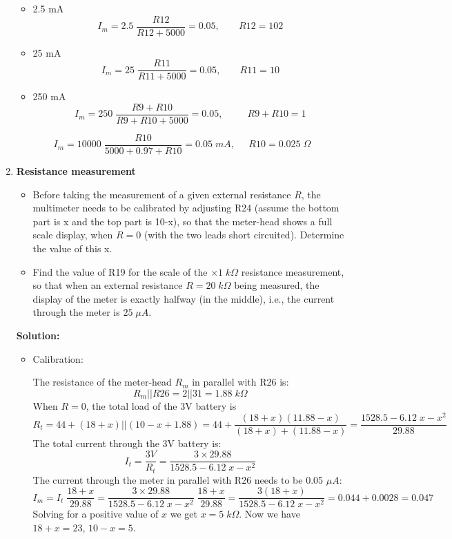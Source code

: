\begin{enumerate}
  \begin{itemize}
  \item 2.5 mA
    \[
    I_m=2.5\;\frac{R12}{R12+5000}=0.05,\;\;\;\;\;\;\;R12=102
    \]
  \item 25 mA
    \[
    I_m=25\;\frac{R11}{R11+5000}=0.05,\;\;\;\;\;\;\;R11=10
    \]
  \item 250 mA
    \[
    I_m=250\;\frac{R9+R10}{R9+R10+5000}=0.05,\;\;\;\;\;\;\;\;\;R9+R10=1
    \]
  \end{itemize}
  \[
  I_m=10000\;\frac{R10}{5000+0.97+R10}=0.05\;mA,\;\;\;\;\;
  R10=0.025\;\Omega
  \]


\item {\bf Resistance measurement}

  \begin{itemize}
  \item Before taking the measurement of a given external resistance $R$, 
    the multimeter needs to be calibrated by adjusting R24 (assume the bottom 
    part is x and the top part is 10-x), so that the meter-head shows a full 
    scale display, when $R=0$ (with the two leads short circuited). Determine 
    the value of this x. 

  \item Find the value of R19 for the scale of the $\times 1\;k\Omega$
    resistance measurement, so that when an external resistance $R=20\;k\Omega$
    being measured, the display of the meter is exactly halfway (in the middle),
    i.e., the current through the meter is $25\;\mu A$.

  \end{itemize}


  {\bf Solution:}
  
  \begin{itemize}
  \item Calibration:

    The resistance of the meter-head $R_m$ in parallel with R26 is:
    \[
    R_m||R26=2||31=1.88\;k\Omega
    \]
    When $R=0$, the total load of the 3V battery is 
    \[
    R_t=44+(18+x)||(10-x+1.88)=44+\frac{(18+x)(11.88-x)}{(18+x)+(11.88-x)}
    =\frac{1528.5-6.12\;x-x^2}{29.88}
    \]
    The total current through the 3V battery is:
    \[
    I_t=\frac{3V}{R_t}=\frac{3\times 29.88}{1528.5-6.12\;x-x^2}
    \]
    The current through the meter in parallel with R26 needs to be 0.05 $\mu A$:
    \[
    I_m=I_t\;\frac{18+x}{29.88}
    =\frac{3\times 29.88}{1528.5-6.12\;x-x^2}\;\frac{18+x}{29.88}
    =\frac{3(18+x)}{1528.5-6.12\;x-x^2}=0.044+0.0028=0.047
    \]
    Solving for a positive value of $x$ we get $x=5\;k\Omega$. Now we have
    $18+x=23$, $10-x=5$. 


\end{itemize}
\end{enumerate}
